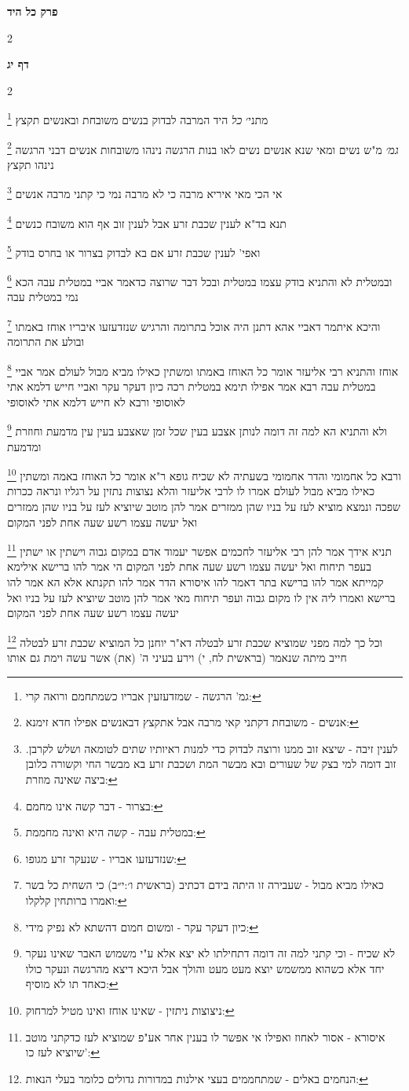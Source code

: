 \documentclass[12pt, openany]{book}
\newcommand{\sethebfont}{
\fontsize{10.5pt}{21.0pt} \selectfont
}
\newcommand{\twocol}[1]{
	{\sethebfont \begin{multicols}{2}
			#1
	\end{multicols}}	
}
\newcommand{\chapname}{}
\newcommand{\sectname}{}
\newcommand{\newchap}[1]{
	\addcontentsline{toc}{chapter}{#1}
	\renewcommand{\chapname}{#1}
		\begin{center}
			\textbf{%
\fontsize{16pt}{16pt}\selectfont
				#1}
		\end{center}
}
\newcommand{\newsection}[1]{
	\renewcommand{\sectname}{#1}	
	\vspace{-\baselineskip}
	\begin{center}
		\textbf{%
\fontsize{16pt}{16pt}\selectfont
			#1}
	\end{center}
	\vspace{-\baselineskip}
	\nopagebreak
}
\newcommand{\footnotecomment}[1]{
	\renewcommand\thefootnote{}
	\footnote{#1}}
\newcommand{\commenta}[1]{\footnotecomment{#1}}
\begin{document}
{\newchap{פרק  כל היד}
\twocol{\clearpage}

\newsection{דף יג}
\twocol{
\commenta{גמ' הרגשה - שמזדעזעין אבריו כשמתחמם ורואה קרי:}
מתני׳ {\large\emph{כל}} היד המרבה לבדוק בנשים משובחת ובאנשים תקצץ
\commenta{אנשים - משובחת דקתני קאי מרבה אבל אתקצץ דבאנשים אפילו חדא זימנא:}
{\large\emph{גמ׳}} מ"ש נשים ומאי שנא אנשים נשים לאו בנות הרגשה נינהו משובחות אנשים דבני הרגשה נינהו תקצץ 
\commenta{לענין זיבה - שיצא זוב ממנו ורוצה לבדוק כדי למנות ראיותיו שתים לטומאה ושלש לקרבן. זוב דומה למי בצק של שעורים ובא מבשר המת ושכבת זרע בא מבשר החי וקשורה כלובן ביצה שאינה מוזרת:}
אי הכי מאי איריא מרבה כי לא מרבה נמי כי קתני מרבה אנשים 
\commenta{בצרור - דבר קשה אינו מחמם:}
תנא בד"א לענין שכבת זרע אבל לענין זוב אף הוא משובח כנשים 
\commenta{במטלית עבה - קשה היא ואינה מחממת:}
ואפי' לענין שכבת זרע אם בא לבדוק בצרור או בחרס בודק 
\commenta{שנזדעזעו אבריו - שנעקר זרע מגופו:}
ובמטלית לא והתניא בודק עצמו במטלית ובכל דבר שרוצה כדאמר אביי במטלית עבה הכא נמי במטלית עבה 
\commenta{כאילו מביא מבול - שעבירה זו היתה בידם דכתיב (בראשית ו׳:י״ב) כי השחית כל בשר ואמרו ברותחין קלקלו:}
והיכא איתמר דאביי אהא דתנן היה אוכל בתרומה והרגיש שנזדעזעו איבריו אוחז באמתו ובולע את התרומה 
\commenta{כיון דעקר עקר - ומשום חמום דהשתא לא נפיק מידי:}
אוחז והתניא רבי אליעזר אומר כל האוחז באמתו ומשתין כאילו מביא מבול לעולם אמר אביי במטלית עבה 
רבא אמר אפילו תימא במטלית רכה כיון דעקר עקר ואביי חייש דלמא אתי לאוסופי ורבא לא חייש דלמא אתי לאוסופי
\commenta{לא שכיח - וכי קתני למה זה דומה דתחילתו לא יצא אלא ע"י משמוש האבר שאינו נעקר יחד אלא כשהוא ממשמש יוצא מעט מעט והולך אבל היכא דיצא מהרגשה ונעקר כולו כאחד תו לא מוסיף:}
 ולא והתניא הא למה זה דומה לנותן אצבע בעין שכל זמן שאצבע בעין עין מדמעת וחוזרת ומדמעת 
\commenta{ניצוצות ניתזין - שאינו אוחז ואינו מטיל למרחוק:}
ורבא כל אחמומי והדר אחמומי בשעתיה לא שכיח 
גופא ר"א אומר כל האוחז באמה ומשתין כאילו מביא מבול לעולם אמרו לו לרבי אליעזר והלא נצוצות נתזין על רגליו ונראה ככרות שפכה ונמצא מוציא לעז על בניו שהן ממזרים 
אמר להן מוטב שיוציא לעז על בניו שהן ממזרים ואל יעשה עצמו רשע שעה אחת לפני המקום 
\commenta{איסורא - אסור לאחוז ואפילו אי אפשר לו בענין אחר אע"פ שמוציא לעז כדקתני מוטב שיוציא לעז כו':}
תניא אידך אמר להן רבי אליעזר לחכמים אפשר יעמוד אדם במקום גבוה וישתין או ישתין בעפר תיחוח ואל יעשה עצמו רשע שעה אחת לפני המקום 
הי אמר להו ברישא אילימא קמייתא אמר להו ברישא בתר דאמר להו איסורא הדר אמר להו תקנתא 
אלא הא אמר להו ברישא ואמרו ליה אין לו מקום גבוה ועפר תיחוח מאי אמר להן מוטב שיוציא לעז על בניו ואל יעשה עצמו רשע שעה אחת לפני המקום
\commenta{הנחמים באלים - שמתחממים בעצי אילנות במדורות גדולים כלומר בעלי הנאות:}
וכל כך למה מפני שמוציא שכבת זרע לבטלה דא"ר יוחנן כל המוציא שכבת זרע לבטלה חייב מיתה שנאמר (בראשית לח, י) וירע בעיני ה' (את) אשר עשה וימת גם אותו 
}}
\end{document}
